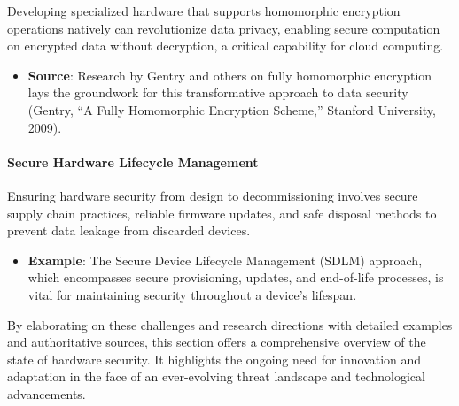 Developing specialized hardware that supports homomorphic encryption
operations natively can revolutionize data privacy, enabling secure
computation on encrypted data without decryption, a critical capability
for cloud computing.

\begin{itemize}
\item
  \textbf{Source}: Research by Gentry and others on fully homomorphic
  encryption lays the groundwork for this transformative approach to
  data security (Gentry, ``A Fully Homomorphic Encryption Scheme,''
  Stanford University, 2009).
\end{itemize}

\hypertarget{secure-hardware-lifecycle-management}{%
\paragraph{Secure Hardware Lifecycle
Management}\label{secure-hardware-lifecycle-management}}

Ensuring hardware security from design to decommissioning involves
secure supply chain practices, reliable firmware updates, and safe
disposal methods to prevent data leakage from discarded devices.

\begin{itemize}
\item
  \textbf{Example}: The Secure Device Lifecycle Management (SDLM)
  approach, which encompasses secure provisioning, updates, and
  end-of-life processes, is vital for maintaining security throughout a
  device's lifespan.
\end{itemize}

By elaborating on these challenges and research directions with detailed
examples and authoritative sources, this section offers a comprehensive
overview of the state of hardware security. It highlights the ongoing
need for innovation and adaptation in the face of an ever-evolving
threat landscape and technological advancements.
